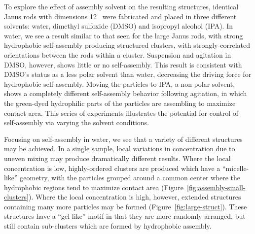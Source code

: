 To explore the effect of assembly solvent on the resulting structures, identical Janus rods with dimensions 
12   \microns~were fabricated and placed in three different solvents: water, dimethyl sulfoxide 
(DMSO) and isopropyl alcohol (IPA).  In water, we see a result similar to that seen for the large Janus rods,
with strong hydrophobic self-assembly producing structured clusters, with strongly-correlated orientations
between the rods within a cluster.  Suspension and agitation in DMSO, however, shows little or no self-assembly.
This result is consistent with DMSO's status as a less polar solvent than water, decreasing the driving force
for hydrophobic self-assembly.  Moving the particles to IPA, a non-polar solvent, shows a completely different
self-assembly behavior following agitation, in which the green-dyed hydrophilic parts of the particles are 
assembling to maximize contact area.  This series of experiments illustrates the potential for 
control of self-assembly via varying the solvent conditions.



Focusing on self-assembly in water, we see that a variety of different structures may be 
achieved.  In a single sample, local variations in concentration due to uneven mixing may produce
dramatically different results.  Where the local concentration is low, highly-ordered clusters 
are produced which have a ``micelle-like'' geometry, with the particles grouped around a common 
center where the hydrophobic regions tend to maximize contact area 
(Figure~\ref{fig:assembly-small-clusters}).  Where the local concentration
is high, however, extended structures containing many more particles may be formed
(Figure~\ref{fig:large-struct}).  These
structures have a ``gel-like'' motif in that they are more randomly arranged, but still contain
sub-clusters which are formed by hydrophobic assembly.

